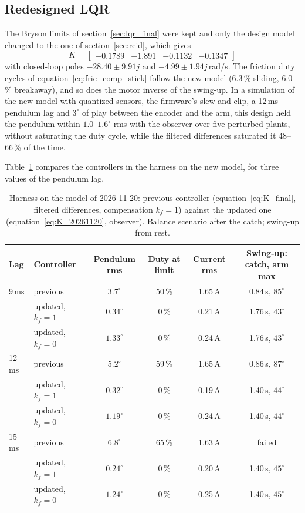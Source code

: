 \documentclass[a4paper,11pt]{article}
\begin{document}
\subsection{Redesigned LQR}
\label{sec:cu_lqr}
The Bryson limits of section~\ref{sec:lqr_final} were kept and only the design model changed to the one of section~\ref{sec:reid}, which gives
\begin{equation}
  \boxed{K = \begin{bmatrix} -0.1789 & -1.891 & -0.1132 & -0.1347 \end{bmatrix}}
  \label{eq:K_20261120}
\end{equation}
with closed-loop poles $-28.40 \pm 9.91j$ and $-4.99 \pm 1.94j\,\mathrm{rad/s}$. The friction duty cycles of equation~\ref{eq:fric_comp_stick} follow the new model (6.3\,\% sliding, 6.0\,\% breakaway), and so does the motor inverse of the swing-up. In a simulation of the new model with quantized sensors, the firmware's slew and clip, a 12\,ms pendulum lag and $3^\circ$ of play between the encoder and the arm, this design held the pendulum within $1.0$--$1.6^\circ$ rms with the observer over five perturbed plants, without saturating the duty cycle, while the filtered differences saturated it 48--66\,\% of the time.

Table~\ref{tab:cu_harness} compares the controllers in the harness on the new model, for three values of the pendulum lag.

\begin{table}[h]
\centering
\caption{Harness on the model of 2026-11-20: previous controller (equation~\ref{eq:K_final}, filtered differences, compensation $k_f = 1$) against the updated one (equation~\ref{eq:K_20261120}, observer). Balance scenario after the catch; swing-up from rest.}
\label{tab:cu_harness}
\small
\begin{tabular}{@{}llcccc@{}}
\toprule
Lag & Controller & Pendulum rms & Duty at limit & Current rms & Swing-up: catch, arm max \\
\midrule
9\,ms & previous & $3.7^\circ$ & 50\,\% & 1.65\,A & 0.84\,s, $85^\circ$ \\
 & updated, $k_f = 1$ & $0.34^\circ$ & 0\,\% & 0.21\,A & 1.76\,s, $43^\circ$ \\
 & updated, $k_f = 0$ & $1.33^\circ$ & 0\,\% & 0.24\,A & 1.76\,s, $43^\circ$ \\
12\,ms & previous & $5.2^\circ$ & 59\,\% & 1.65\,A & 0.86\,s, $87^\circ$ \\
 & updated, $k_f = 1$ & $0.32^\circ$ & 0\,\% & 0.19\,A & 1.40\,s, $44^\circ$ \\
 & updated, $k_f = 0$ & $1.19^\circ$ & 0\,\% & 0.24\,A & 1.40\,s, $44^\circ$ \\
15\,ms & previous & $6.8^\circ$ & 65\,\% & 1.63\,A & failed \\
 & updated, $k_f = 1$ & $0.24^\circ$ & 0\,\% & 0.20\,A & 1.40\,s, $45^\circ$ \\
 & updated, $k_f = 0$ & $1.24^\circ$ & 0\,\% & 0.25\,A & 1.40\,s, $45^\circ$ \\
\bottomrule
\end{tabular}
\end{table}
\end{document}
